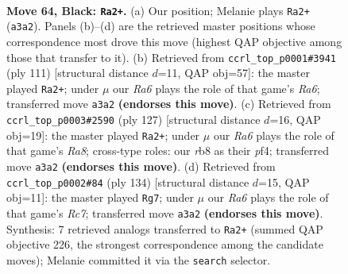 \documentclass[11pt]{article}
\begin{document}
\clearpage

\begin{figure}[p]\centering
\begin{subfigure}{0.46\textwidth}\centering
\resizebox{\linewidth}{!}{%
\newchessgame
\chessboard[
  setfen={1R6/R4pk1/4p3/8/P3P3/r4P2/4K3/8 b - - 20 64},
  showmover=false,
  pgfstyle=straightmove, color=movearrow, markmove={a3-a2}
]}
\caption{}
\end{subfigure}\hfill
\begin{subfigure}{0.46\textwidth}\centering
\resizebox{\linewidth}{!}{%
\newchessgame
\chessboard[
  setfen={8/8/R4pk1/6p1/P5P1/r6P/6K1/8 b - - 2 56},
  showmover=false,
  pgfstyle=straightmove, color=movearrow, markmove={a3-a2}
]}
\caption{}
\end{subfigure}
\\[4pt]
\begin{subfigure}{0.46\textwidth}\centering
\resizebox{\linewidth}{!}{%
\newchessgame
\chessboard[
  setfen={8/R5p1/8/1P6/P2k1P2/3p4/3K4/r7 b - - 2 64},
  showmover=false,
  pgfstyle=straightmove, color=movearrow, markmove={a1-a2}
]}
\caption{}
\end{subfigure}\hfill
\begin{subfigure}{0.46\textwidth}\centering
\resizebox{\linewidth}{!}{%
\newchessgame
\chessboard[
  setfen={3k4/2R5/2p2r1p/6p1/6P1/5P2/5K2/8 w - - 12 68},
  showmover=false,
  pgfstyle=straightmove, color=movearrow, markmove={c7-g7}
]}
\caption{}
\end{subfigure}
\caption{\textbf{Move 64, Black: \texttt{Ra2+}.} (a) Our position; Melanie plays \texttt{Ra2+} (\texttt{a3a2}). Panels (b)--(d) are the retrieved master positions whose correspondence most drove this move (highest QAP objective among those that transfer to it). (b) Retrieved from \texttt{ccrl\_top\_p0001\#3941} (ply 111) [structural distance $d$=11, QAP obj=57]: the master played \texttt{Ra2+}; under $\mu$ our \emph{Ra6} plays the role of that game's \emph{Ra6}; transferred move \texttt{a3a2} \textbf{(endorses this move)}. (c) Retrieved from \texttt{ccrl\_top\_p0003\#2590} (ply 127) [structural distance $d$=16, QAP obj=19]: the master played \texttt{Ra2+}; under $\mu$ our \emph{Ra6} plays the role of that game's \emph{Ra8}; cross-type roles: our \emph{r}b8 as their \emph{p}f4; transferred move \texttt{a3a2} \textbf{(endorses this move)}. (d) Retrieved from \texttt{ccrl\_top\_p0002\#84} (ply 134) [structural distance $d$=15, QAP obj=11]: the master played \texttt{Rg7}; under $\mu$ our \emph{Ra6} plays the role of that game's \emph{Rc7}; transferred move \texttt{a3a2} \textbf{(endorses this move)}. Synthesis: 7 retrieved analogs transferred to \texttt{Ra2+} (summed QAP objective 226, the strongest correspondence among the candidate moves); Melanie committed it via the \texttt{search} selector.}
\label{fig:thought-m127}
\end{figure}
\end{document}
